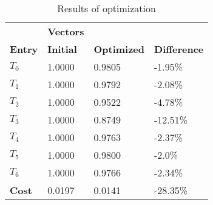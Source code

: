 \begin{table}[h!]
\centering
\begin{tabular}{llll}
\textbf{}      & \cellcolor[HTML]{EFEFEF}\textbf{Vectors} & \textbf{} & \textbf{}         \\
\rowcolor[HTML]{EFEFEF} 
\textbf{Entry} & \textbf{Initial} & \textbf{Optimized} & \textbf{Difference} \\
$T_0$ & 1.0000 & 0.9805 & -1.95\% \\ 
$T_1$ & 1.0000 & 0.9792 & -2.08\% \\ 
$T_2$ & 1.0000 & 0.9522 & -4.78\% \\ 
$T_3$ & 1.0000 & 0.8749 & -12.51\% \\ 
$T_4$ & 1.0000 & 0.9763 & -2.37\% \\ 
$T_5$ & 1.0000 & 0.9800 & -2.0\% \\ 
$T_6$ & 1.0000 & 0.9766 & -2.34\% \\ 
\rowcolor[HTML]{EFEFEF} 
\textbf{Cost}  & 0.0197 & 0.0141 & -28.35\% \\ 
\end{tabular}
\caption{Results of optimization}
\label{tab:OptimizationAnalysis}
\end{table}